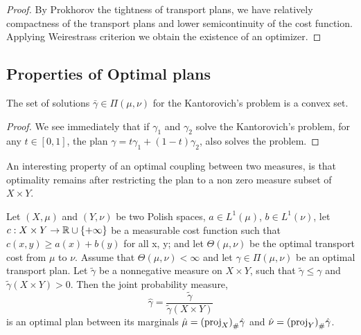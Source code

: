 \begin{theorem}
\begin{proof}
 By Prokhorov the tightness of transport plans, we have relatively compactness of the transport plans and lower semicontinuity of the cost function. Applying Weirestrass criterion we obtain the existence of an optimizer.
\end{proof}


\subsection{Properties of Optimal plans}
\begin{theorem}
	The set of solutions $\bar\gamma\in\Pi(\mu,\nu)$ for the Kantorovich's problem is a convex set.
\end{theorem}
\begin{proof}
	We see immediately that if $\gamma_1$ and $\gamma_2$ solve the Kantorovich's problem, for any $t\in[0,1]$, the plan $\gamma=t\gamma_1+(1-t)\gamma_2$, also solves the problem. 
\end{proof}
\end{theorem}
An interesting property of an optimal coupling between two measures, is that optimality remains after restricting the plan to a non zero measure subset of $X\times Y$. 
\begin{theorem}
	Let $(X, \mu)$ and $(Y, \nu)$ be two Polish spaces, $a \in L^1(\mu)$, $b \in L^1(\nu)$, let $c : X \times Y \rightarrow
	\mathbb{R}\cup \left\lbrace +\infty \right\rbrace$ be a measurable cost function such that $c(x, y) \geq a(x) + b(y)$ for all x, y; and let $\Theta(\mu, \nu)$ be the optimal transport cost from $\mu$ to $\nu$.
	Assume that $\Theta(\mu, \nu)<\infty$  and let $\gamma \in \Pi(\mu,\nu)$ be an optimal transport plan. Let $\tilde\gamma$ be a nonnegative measure on $X\times Y$, such that $\tilde \gamma\leq \gamma$ and $\tilde \gamma(X\times Y)>0$. Then the joint probability measure,
	\begin{equation*}
	\hat\gamma = \frac{\tilde\gamma}{\tilde\gamma(X\times Y)}
	\end{equation*}
	is an optimal plan between its marginals $\hat\mu={(\mathrm{proj}_X)}_{\#} \hat \gamma$ and $\hat\nu ={(\mathrm{proj}_Y)}_{\#} \hat \gamma$. 	
\end{theorem}

